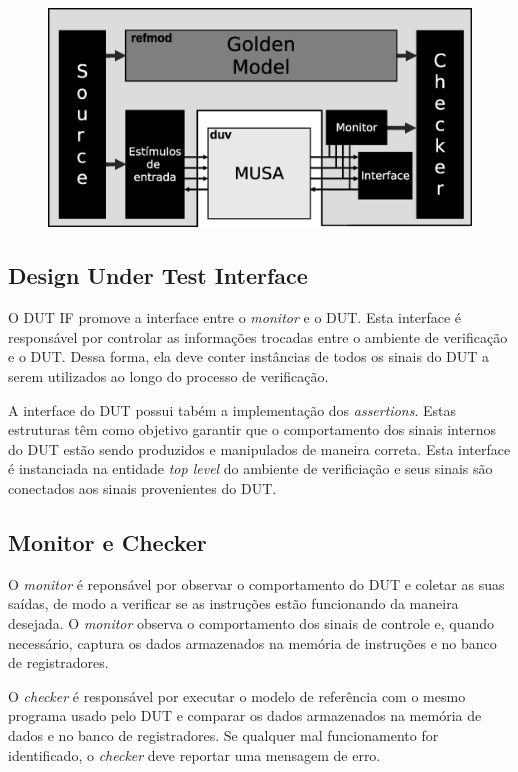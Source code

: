 \documentclass{article}
\begin{document}
	\begin{figure}[H]
    	\centering
    	\includegraphics[width=.7\linewidth]{pictures/ver_model.eps}
  	\end{figure} 

	\subsection{Design Under Test Interface}
	
	O DUT IF promove a interface entre o \textit{monitor} e o DUT. Esta interface é responsável por controlar as informações trocadas entre o ambiente de verificação e o DUT. Dessa forma, ela deve conter instâncias de todos os sinais do DUT a serem utilizados ao longo do processo de verificação.
	
  A interface do DUT possui tabém a implementação dos \textit{assertions}. Estas estruturas têm como objetivo garantir que o comportamento dos sinais internos do DUT estão sendo produzidos e manipulados de maneira correta. Esta interface é instanciada na entidade \textit{top level} do ambiente de verificiação e seus sinais são conectados aos sinais provenientes do DUT.

	\subsection{Monitor e Checker}
	
  O \textit{monitor} é reponsável por observar o comportamento do DUT e coletar as suas saídas, de modo a verificar se as instruções estão funcionando da maneira desejada. O \textit{monitor} observa o comportamento dos sinais de controle e, quando necessário, captura os dados armazenados na memória de instruções e no banco de registradores.
	
  O \textit{checker} é responsável por executar o modelo de referência com o mesmo programa usado pelo DUT e comparar os dados armazenados na memória de dados e no banco de registradores. Se qualquer mal funcionamento for identificado, o \textit{checker} deve reportar uma mensagem de erro.
\end{document}
